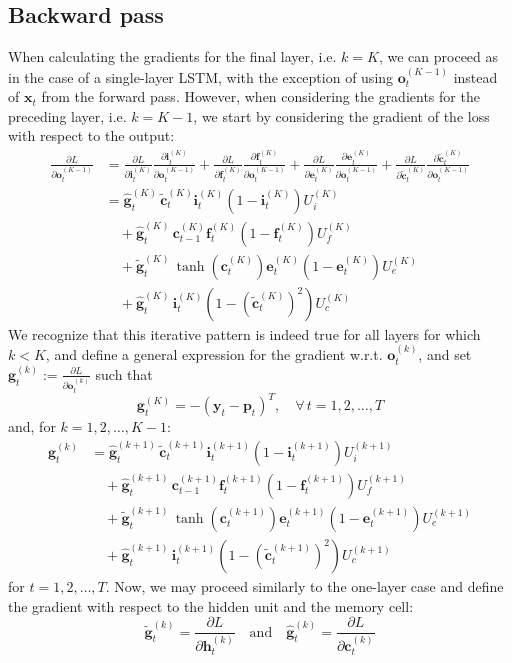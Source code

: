 \documentclass{article}
\begin{document}
\subsection*{Backward pass}
	When calculating the gradients for the final layer, i.e. $k = K$, we can proceed as in the case of a single-layer LSTM, with the exception of using $\bm{o}_t^{(K-1)}$ instead of $\bm{x}_t$ from the forward pass. However, when considering the gradients for the preceding layer, i.e. $k = K-1$, we start by considering the gradient of the loss with respect to the output:
	\begin{align*} \frac{\partial L}{\partial \bm{o}_t^{(K-1)}} &= \frac{\partial L}{\partial \bm{i}_t^{(K)}} \frac{\partial \bm{i}_t^{(K)}}{\partial \bm{o}_t^{(K-1)}} + \frac{\partial L}{\partial \bm{f}_t^{(K)}} \frac{\partial \bm{f}_t^{(K)}}{\partial \bm{o}_t^{(K-1)}} + \frac{\partial L}{\partial \bm{e}_t^{(K)}} \frac{\partial \bm{e}_t^{(K)}}{\partial \bm{o}_t^{(K-1)}} + \frac{\partial L}{\partial \tilde{\bm{c}}_t^{(K)}} \frac{\partial \tilde{\bm{c}}_t^{(K)}}{\partial \bm{o}_t^{(K-1)}}\\
	&= \hat{\bm{g}}_t^{(K)}\,\tilde{\bm{c}}_t^{(K)} \bm{i}_t^{(K)} (1 - \bm{i}_t^{(K)}) U_i^{(K)}\\
	&\quad + \hat{\bm{g}}_t^{(K)}\,\bm{c}_{t-1}^{(K)} \bm{f}_t^{(K)} (1 - \bm{f}_t^{(K)}) U_f^{(K)}\\
	&\quad + \tilde{\bm{g}}_t^{(K)}\,  \tanh(\bm{c}_t^{(K)})\bm{e}_t^{(K)}(1 - \bm{e}_t^{(K)})U_e^{(K)}\\
	&\quad +  \hat{\bm{g}}_t^{(K)}\, \bm{i}_t^{(K)} (1 - (\tilde{\bm{c}}_t^{(K)})^2)U_c^{(K)}
	\end{align*}
	We recognize that this iterative pattern is indeed true for all layers for which $k < K$, and define a general expression for the gradient w.r.t. $\bm{o}_t^{(k)}$, and set $\bm{g}_t^{(k)} := \frac{\partial L}{\partial \bm{o}_t^{(k)}}$ such that
	$$\bm{g}_t^{(K)} = -(\bm{y}_t - \bm{p}_t)^T, \quad \forall\, t = 1, 2, \dots, T$$
	and, for $k = 1, 2, \dots, K - 1$:
	\begin{align*}
		\bm{g}_t^{(k)} &= \hat{\bm{g}}_t^{(k+1)}\,\tilde{\bm{c}}_t^{(k+1)} \bm{i}_t^{(k+1)} (1 - \bm{i}_t^{(k+1)}) U_i^{(k+1)} \\
		&\quad + \hat{\bm{g}}_t^{(k+1)}\,\bm{c}_{t-1}^{(k+1)} \bm{f}_t^{(k+1)} (1 - \bm{f}_t^{(k+1)}) U_f^{(k+1)}\\		&\quad + \tilde{\bm{g}}_t^{(k+1)}\,  \tanh(\bm{c}_t^{(k+1)})\bm{e}_t^{(k+1)}(1 - \bm{e}_t^{(k+1)})U_e^{(k+1)}\\
		&\quad +  \hat{\bm{g}}_t^{(k+1)}\, \bm{i}_t^{(k+1)} (1 - (\tilde{\bm{c}}_t^{(k+1)})^2)U_c^{(k+1)}	
	\end{align*}
	for $t = 1, 2, \dots, T$. Now, we may proceed similarly to the one-layer case and define the gradient with respect to the hidden unit and the memory cell:
	$$\tilde{\bm{g}}_t^{(k)} = \frac{\partial L}{\partial \bm{h}_t^{(k)}}\quad\text{and}\quad \hat{\bm{g}}_t^{(k)} = \frac{\partial L}{\partial \bm{c}_t^{(k)}}$$
\end{document}
